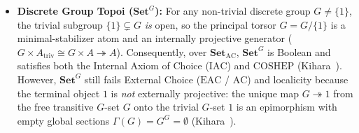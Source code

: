 \begin{itemize}

  \item \textbf{Discrete Group Topoi ($\mathbf{Set}^G$):} For any non-trivial discrete group $G \neq \{1\}$, the trivial subgroup $\{1\} \subsetneq G$ \emph{is} open, so the principal torsor $G = G/\{1\}$ is a minimal-stabilizer atom and an internally projective generator ($G \times A_{\mathrm{triv}} \cong G \times A \twoheadrightarrow A$). Consequently, over $\mathbf{Set}_{\mathrm{AC}}$, $\mathbf{Set}^G$ is Boolean and satisfies both the Internal Axiom of Choice ($\mathrm{IAC}$) and $\mathrm{COSHEP}$ (Kihara~\cite[Theorem~6.2]{Kihara26}). However, $\mathbf{Set}^G$ still fails External Choice ($\mathrm{EAC}$ / $\mathrm{AC}$) and localicity because the terminal object $1$ is \emph{not} externally projective: the unique map $G \twoheadrightarrow 1$ from the free transitive $G$-set $G$ onto the trivial $G$-set $1$ is an epimorphism with empty global sections $\Gamma(G) = G^G = \emptyset$ (Kihara~\cite[Theorem~6.19]{Kihara26}).


\end{itemize}
